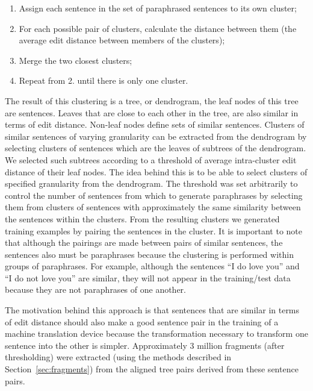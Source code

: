 \begin{enumerate}
\item Assign each sentence in the set of paraphrased sentences to its own cluster; 
\item For each possible pair of clusters, calculate the distance between them (the average edit distance between members of the clusters);
\item Merge the two closest clusters;
\item Repeat from 2. until there is only one cluster.
\end{enumerate}




The result of this clustering is a tree, or dendrogram, the leaf nodes of this tree are sentences. Leaves that
are close to each other in the tree, are also similar in terms of edit distance. Non-leaf nodes define sets of
similar sentences.  Clusters of similar sentences of varying granularity can be extracted from the dendrogram by
selecting clusters of sentences which are the leaves of subtrees of the dendrogram.  We selected such subtrees
according to a threshold of average intra-cluster edit distance of their leaf nodes. The idea behind this is to
be able to select clusters of specified granularity from the dendrogram. The threshold was set arbitrarily
to control the number of sentences from which to generate paraphrases by selecting them from clusters of sentences with
approximately the same similarity between the sentences within the clusters. From the resulting
clusters we generated training examples by pairing the sentences in the  cluster. It is important to note that
although the pairings are made between pairs of similar sentences, the sentences also must be paraphrases
because the clustering is performed within groups of paraphrases.  For example, although the sentences ``I do
love you'' and ``I do not love you''  are similar, they will not appear in the training/test data because they
are not paraphrases of one another.

The motivation behind this approach is that sentences that are similar in terms of edit distance should also make
a good sentence pair in the training of a machine translation device because the  transformation necessary to
transform one sentence into the other is simpler.
Approximately 3 million fragments (after thresholding)
were extracted (using the methods described in Section~\ref{sec:fragments}) from the aligned tree pairs derived from these sentence pairs. 

